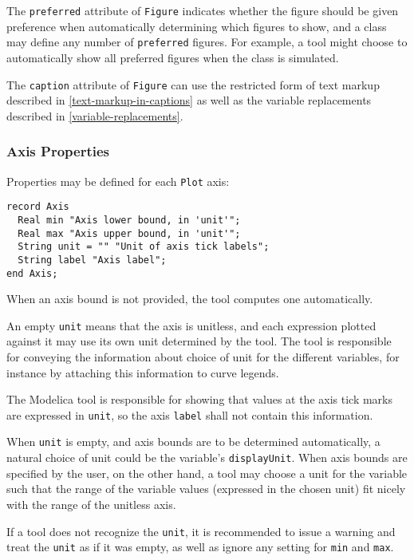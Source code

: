 The \lstinline!preferred! attribute of \lstinline!Figure! indicates whether the figure should be given preference when automatically determining which figures to show,
and a class may define any number of \lstinline!preferred! figures.  For example, a tool might choose to automatically show all preferred figures when the class is simulated.

The \lstinline!caption! attribute of \lstinline!Figure! can use the restricted
form of text markup described in \cref{text-markup-in-captions} as well as
the variable replacements described in \cref{variable-replacements}.

\subsubsection{Axis Properties}\label{axis-properties}

Properties may be defined for each \lstinline!Plot! axis:
\begin{lstlisting}[language=modelica]
record Axis
  Real min "Axis lower bound, in 'unit'";
  Real max "Axis upper bound, in 'unit'";
  String unit = "" "Unit of axis tick labels";
  String label "Axis label";
end Axis;
\end{lstlisting}

When an axis bound is not provided, the tool computes one automatically.

An empty \lstinline!unit! means that the axis is unitless, and each expression plotted against it may use its own unit determined by the tool.  The tool is responsible for conveying the information
about choice of unit for the different variables, for instance by attaching this information to curve legends.

The Modelica tool is responsible for showing that values at the axis tick marks are expressed in \lstinline!unit!, so the axis \lstinline!label! shall not contain this information.

\begin{nonnormative}
When \lstinline!unit! is empty, and axis bounds are to be determined automatically, a natural choice of unit could be the variable's \lstinline!displayUnit!.  When axis bounds are specified by the
user, on the other hand, a tool may choose a unit for the variable such that the range of the variable values (expressed in the chosen unit) fit nicely with the range of the unitless axis.
\end{nonnormative}

If a tool does not recognize the \lstinline!unit!, it is recommended to issue a warning and treat the \lstinline!unit! as if it was empty, as well as ignore any setting for \lstinline!min! and \lstinline!max!.

